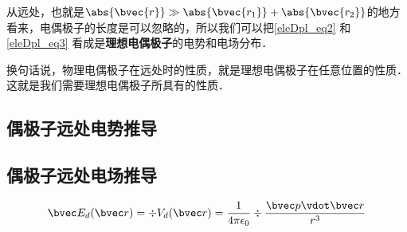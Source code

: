 从远处，也就是$\abs{\bvec{r}}\gg\\\abs{\bvec{r_1}}+\abs{\bvec{r_2}}$的地方看来，电偶极子的长度是可以忽略的，所以我们可以把\autoref{eleDpl_eq2} 和\autoref{eleDpl_eq3} 看成是\textbf{理想电偶极子}的电势和电场分布．

换句话说，物理电偶极子在远处时的性质，就是理想电偶极子在任意位置的性质．这就是我们需要理想电偶极子所具有的性质．



\subsection{偶极子远处电势推导}

\subsection{偶极子远处电场推导}

\begin{equation}
\bvec E_d(\bvec r) = \div V_d(\bvec r) = \frac{1}{4\pi\epsilon_0} \div  \frac{\bvec p\vdot \bvec r}{r^3}
\end{equation}
